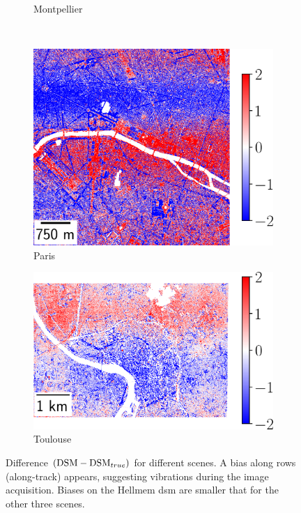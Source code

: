 \begin{figure}
\begin{subfigure}[t]{0.48\linewidth}
        \caption{Montpellier}
        \label{fig:vibrations_Montpellier}
    \end{subfigure}\\
    \begin{subfigure}[t]{0.48\linewidth}
        \flushleft
        \includegraphics[width=\linewidth]{Images/Chap_6/vibrations_Paris.png}
        \caption{Paris}
        \label{fig:vibrations_Paris}
    \end{subfigure}\hfill
    \begin{subfigure}[t]{0.48\linewidth}
        \flushright
        \includegraphics[width=\linewidth]{Images/Chap_6/vibrations_Toulouse.png}
        \caption{Toulouse}
        \label{fig:vibrations_Toulouse}
    \end{subfigure}
    \caption{Difference $(\mathrm{DSM}-\mathrm{DSM}_{true})$ for different scenes. A bias along rows (along-track) appears, suggesting vibrations during the image acquisition. Biases on the Hellmem \acrshort{dsm} are smaller that for the other three scenes.}
    \label{fig:vibrations}
\end{figure}

